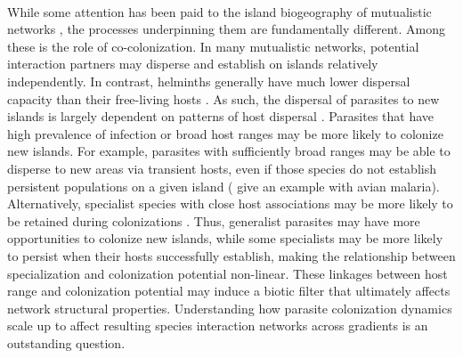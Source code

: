 \paragraph*{} While some attention has been paid to the island biogeography of mutualistic networks \parencite{sugiura2010, dalsgaard2013, traveset2016, nogales2024review}, the processes underpinning them are fundamentally different. Among these is the role of co-colonization. In many mutualistic networks, potential interaction partners may disperse and establish on islands relatively independently. In contrast, helminths generally have much lower dispersal capacity than their free-living hosts \parencite{poulin2004macroecological}. As such, the dispersal of parasites to new islands is largely dependent on patterns of host dispersal \parencite{font2003global, bataille2017colonization}. Parasites that have high prevalence of infection or broad host ranges may be more likely to colonize new islands. For example, parasites with sufficiently broad ranges may be able to disperse to new areas via transient hosts, even if those species do not establish persistent populations on a given island (\textcite{ellis2023host} give an example with avian malaria). Alternatively, specialist species with close host associations may be more likely to be retained during colonizations \parencite{schatz2023patterns}. Thus, generalist parasites may have more opportunities to colonize new islands, while some specialists may be more likely to persist when their hosts successfully establish, making the relationship between specialization and colonization potential non-linear. These linkages between host range and colonization potential may induce a biotic filter that ultimately affects network structural properties. Understanding how parasite colonization dynamics scale up to affect resulting species interaction networks across gradients is an outstanding question. 

